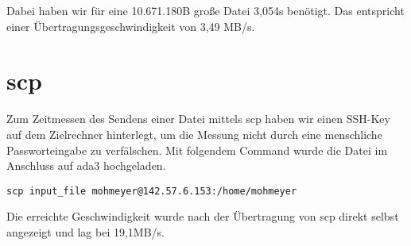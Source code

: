 \vspace{0.5cm}

\noindent
Dabei haben wir für eine 10.671.180B große Datei 3,054s benötigt. Das entspricht einer Übertragungsgeschwindigkeit von 3,49 MB/s.

\newpage

\section{scp}
Zum Zeitmessen des Sendens einer Datei mittels scp haben wir einen SSH-Key auf dem Zielrechner hinterlegt, um die Messung nicht durch eine menschliche Passworteingabe zu verfälschen. Mit folgendem Command wurde die Datei im Anschluss auf ada3 hochgeladen.

\begin{tcolorbox}[colback=gray!10,colframe=black,boxrule=0.5pt]
\begin{verbatim}
scp input_file mohmeyer@142.57.6.153:/home/mohmeyer
\end{verbatim}
\end{tcolorbox}

\noindent
Die erreichte Geschwindigkeit wurde nach der Übertragung von scp direkt selbst angezeigt und lag bei 19,1MB/s.